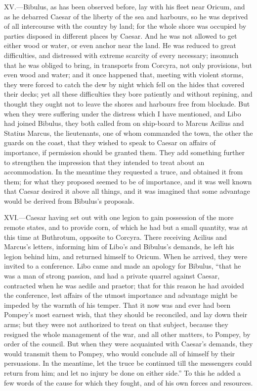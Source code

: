 XV.—Bibulus, as has been observed before, lay with his fleet near
Oricum, and as he debarred Caesar of the liberty of the sea and
harbours, so he was deprived of all intercourse with the country by
land; for the whole shore was occupied by parties disposed in different
places by Caesar. And he was not allowed to get either wood or water, or
even anchor near the land. He was reduced to great difficulties, and
distressed with extreme scarcity of every necessary; insomuch that he
was obliged to bring, in transports from Corcyra, not only provisions,
but even wood and water; and it once happened that, meeting with violent
storms, they were forced to catch the dew by night which fell on the
hides that covered their decks; yet all these difficulties they bore
patiently and without repining, and thought they ought not to leave the
shores and harbours free from blockade. But when they were suffering
under the distress which I have mentioned, and Libo had joined Bibulus,
they both called from on ship-board to Marcus Acilius and Statius
Marcus, the lieutenants, one of whom commanded the town, the other the
guards on the coast, that they wished to speak to Caesar on affairs of
importance, if permission should be granted them. They add something
further to strengthen the impression that they intended to treat about
an accommodation. In the meantime they requested a truce, and obtained
it from them; for what they proposed seemed to be of importance, and it
was well known that Caesar desired it above all things, and it was
imagined that some advantage would be derived from Bibulus's proposals.

XVI.—Caesar having set out with one legion to gain possession of the
more remote states, and to provide corn, of which he had but a small
quantity, was at this time at Buthrotum, opposite to Corcyra. There
receiving Acilius and Marcus's letters, informing him of Libo's and
Bibulus's demands, he left his legion behind him, and returned himself
to Oricum. When he arrived, they were invited to a conference. Libo came
and made an apology for Bibulus, ``that he was a man of strong passion,
and had a private quarrel against Caesar, contracted when he was aedile
and praetor; that for this reason he had avoided the conference, lest
affairs of the utmost importance and advantage might be impeded by the
warmth of his temper. That it now was and ever had been Pompey's most
earnest wish, that they should be reconciled, and lay down their arms;
but they were not authorized to treat on that subject, because they
resigned the whole management of the war, and all other matters, to
Pompey, by order of the council. But when they were acquainted with
Caesar's demands, they would transmit them to Pompey, who would conclude
all of himself by their persuasions. In the meantime, let the truce be
continued till the messengers could return from him; and let no injury
be done on either side.'' To this he added a few words of the cause for
which they fought, and of his own forces and resources.

